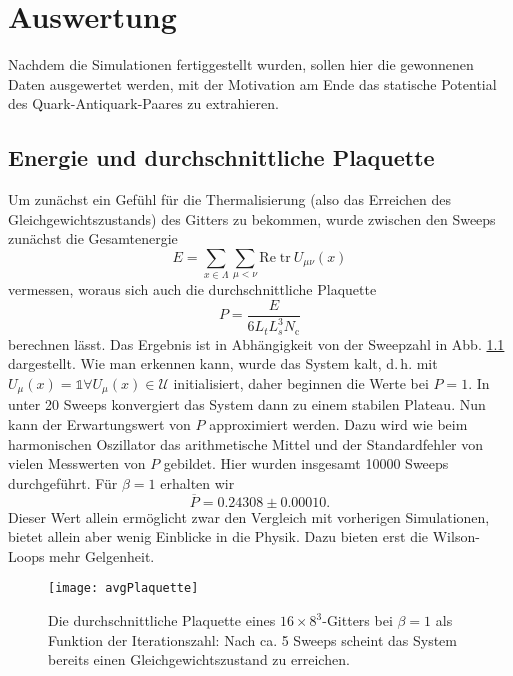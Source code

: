 
\chapter{Auswertung}
\label{sec:auswertung}

Nachdem die Simulationen fertiggestellt wurden, sollen hier die gewonnenen Daten
ausgewertet werden, mit der Motivation am Ende das statische Potential des
Quark-Antiquark-Paares zu extrahieren.

\section{Energie und durchschnittliche Plaquette}
Um zunächst ein Gefühl für die Thermalisierung (also das Erreichen des
Gleichgewichtszustands) des Gitters zu bekommen, wurde zwischen den Sweeps zunächst
die Gesamtenergie
\[
    E = \sum_{x \in \Lambda} \sum_{\mu < \nu} \text{Re} \; \text{tr}~U_{\mu \nu}(x)
\]
vermessen, woraus sich auch die durchschnittliche Plaquette
\[
    P = \frac{E}{6 L_t L_s^3 N_\mathrm{c}}
\]
berechnen lässt. Das Ergebnis ist in Abhängigkeit von der Sweepzahl in Abb.
\ref{fig:avgPlaquette} dargestellt. Wie man erkennen kann, wurde das System kalt, d.\,h.
mit $U_\mu(x) = \mathds{1} \forall U_\mu(x) \in \mathcal{U}$ initialisiert, daher
beginnen die Werte bei $P = 1$. In unter 20 Sweeps konvergiert das System dann zu
einem stabilen Plateau. Nun kann der Erwartungswert von $P$ approximiert werden.
Dazu wird wie beim harmonischen Oszillator das arithmetische Mittel und der
Standardfehler von vielen Messwerten von $P$ gebildet. Hier wurden insgesamt
10000 Sweeps durchgeführt. Für $\beta = 1$ erhalten wir
\[
    \overline{P} = 0.24308 \pm 0.00010.
\]
Dieser Wert allein ermöglicht zwar den Vergleich mit vorherigen Simulationen, bietet
allein aber wenig Einblicke in die Physik. Dazu bieten erst die Wilson-Loops
mehr Gelgenheit.

\begin{figure}[htbp]
    \centering
    \texttt{[image: avgPlaquette]}
    \caption{Die durchschnittliche Plaquette eines $16 \times 8^3$-Gitters bei
    $\beta = 1$ als Funktion der Iterationszahl: Nach ca. 5 Sweeps scheint das System
    bereits einen Gleichgewichtszustand zu erreichen.}
    \label{fig:avgPlaquette}
\end{figure}

